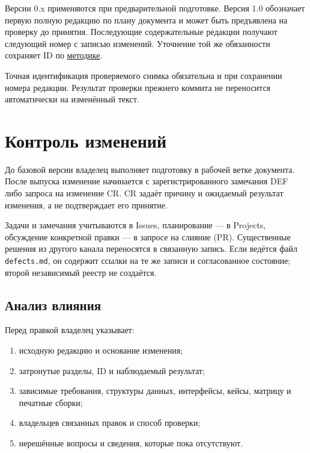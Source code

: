 \documentclass[12pt,a4paper]{article}
\newcommand{\tightlist}{\setlength{\itemsep}{0pt}\setlength{\parskip}{0pt}}
\begin{document}
Версии 0.x применяются при предварительной подготовке. Версия 1.0 обозначает первую полную редакцию по плану документа и может быть предъявлена на проверку до принятия. Последующие содержательные редакции получают следующий номер с записью изменений. Уточнение той же обязанности сохраняет ID по {\href{../02\_Общие\_соглашения/Методика\_идентификаторов.pdf\#методика-идентификаторов}{методике}}.

Точная идентификация проверяемого снимка обязательна и при сохранении номера редакции. Результат проверки прежнего коммита не переносится автоматически на изменённый текст.

\section{Контроль изменений}\label{5-ux43aux43eux43dux442ux440ux43eux43bux44c-ux438ux437ux43cux435ux43dux435ux43dux438ux439}

\hypertarget{5-контроль-изменений}{}

До базовой версии владелец выполняет подготовку в рабочей ветке документа. После выпуска изменение начинается с зарегистрированного замечания DEF либо запроса на изменение CR. CR задаёт причину и ожидаемый результат изменения, а не подтверждает его принятие.

Задачи и замечания учитываются в Issues, планирование --- в Projects, обсуждение конкретной правки --- в запросе на слияние (PR). Существенные решения из другого канала переносятся в связанную запись. Если ведётся файл \texttt{defects.md}, он содержит ссылки на те же записи и согласованное состояние; второй независимый реестр не создаётся.

\subsection{Анализ влияния}\label{ux430ux43dux430ux43bux438ux437-ux432ux43bux438ux44fux43dux438ux44f}

\hypertarget{анализ-влияния}{}

Перед правкой владелец указывает:

\begin{enumerate}
\def\labelenumi{\arabic{enumi}.}
\tightlist
\item
  исходную редакцию и основание изменения;
\item
  затронутые разделы, ID и наблюдаемый результат;
\item
  зависимые требования, структуры данных, интерфейсы, кейсы, матрицу и печатные сборки;
\item
  владельцев связанных правок и способ проверки;
\item
  нерешённые вопросы и сведения, которые пока отсутствуют.
\end{enumerate}
\end{document}
